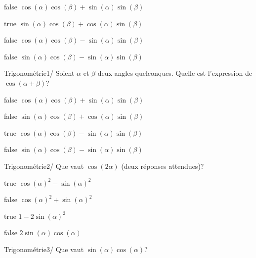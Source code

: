 \documentclass[11pt]{article}
\begin{document}
            \begin{reponses}
            	\item[false] $\cos(\alpha)\cos(\beta)+\sin(\alpha)\sin(\beta)$
            	\item[true] $\sin(\alpha)\cos(\beta)+\cos(\alpha)\sin(\beta)$
                \item[false] $\cos(\alpha)\cos(\beta)-\sin(\alpha)\sin(\beta)$
                \item[false] $\sin(\alpha)\cos(\beta)-\sin(\alpha)\sin(\beta)$
            \end{reponses}
        
        	\begin{question}{47}{Trigonométrie}{1}{/}
				Soient $\alpha$ et $\beta$ deux angles quelconques. Quelle est l'expression de $\cos(\alpha+\beta)$?
            \end{question}

            \begin{reponses}
            	\item[false] $\cos(\alpha)\cos(\beta)+\sin(\alpha)\sin(\beta)$
            	\item[false] $\sin(\alpha)\cos(\beta)+\cos(\alpha)\sin(\beta)$
                \item[true] $\cos(\alpha)\cos(\beta)-\sin(\alpha)\sin(\beta)$
                \item[false] $\sin(\alpha)\cos(\beta)-\sin(\alpha)\sin(\beta)$
            \end{reponses}

            \begin{question}{47}{Trigonométrie}{2}{/}
            	Que vaut $\cos(2\alpha)$ (deux réponses attendues)?
            \end{question}

            \begin{reponses}
                \item[true] $\cos(\alpha)^2-\sin(\alpha)^2$
                \item[false] $\cos(\alpha)^2+\sin(\alpha)^2$
                \item[true] $1-2\sin(\alpha)^2$
                \item[false] $2\sin(\alpha)\cos(\alpha)$
            \end{reponses}

            \begin{question}{47}{Trigonométrie}{3}{/}
            	Que vaut $\sin(\alpha)\cos(\alpha)$?
            \end{question}
\end{document}
